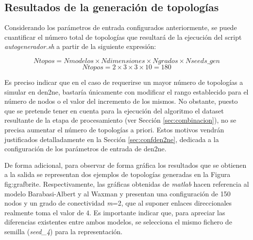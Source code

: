 \subsection{Resultados de la generación de topologías}
\label{sec:gentopo}

Considerando los parámetros de entrada configurados anteriormente, se puede cuantificar el número total de topologías que resultará de la ejecución del script \textit{autogenerador.sh} a partir de la siguiente expresión:

    \[\textit{Ntopos} = \textit{Nmodelos} \times \textit{Ndimensiones}
    \times \textit{Ngrados} \times \textit{Nseeds\_gen}\]
    \[\textit{Ntopos} = 2 \times 3 \times 3 \times 10 = 180\]

\vspace{3mm}

Es preciso indicar que en el caso de requerirse un mayor número de topologías a simular en \gls{den2ne}, bastaría únicamente con modificar el rango establecido para el número de nodos o el valor del incremento de los mismos. No obstante, puesto que se pretende tener en cuenta para la ejecución del algoritmo el dataset resultante de la etapa de procesamiento (ver Sección \ref{sec:combinacion}), no se precisa aumentar el número de topologías a priori. Estos motivos vendrán justificados detalladamente en la Sección \ref{sec:confden2ne}, dedicada a la configuración de los parámetros de entrada de \gls{den2ne}.

\vspace{3mm}

De forma adicional, para observar de forma gráfica los resultados que se obtienen a la salida se representan dos ejemplos de topologías generadas en la Figura {fig:grafbrite}. Respectivamente, las gráficas obtenidas de \textit{matlab} hacen referencia al modelo Barabasi-Albert y al Waxman y presentan una configuración de 150 nodos y un grado de conectividad \textit{m}=2, que al suponer enlaces direccionales realmente toma el valor de 4. Es importante indicar que, para apreciar las diferencias existentes entre ambos modelos, se selecciona el mismo fichero de semilla (\textit{seed\_4}) para la representación.

\vspace{3mm}

